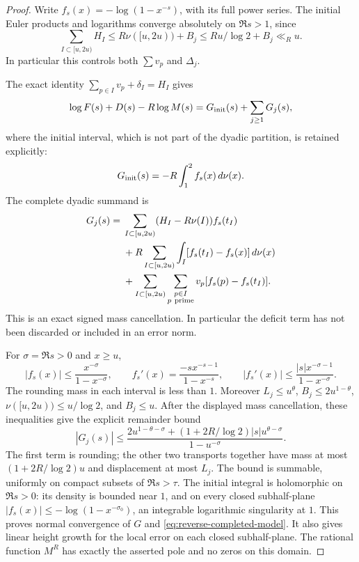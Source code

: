 \documentclass[11pt]{article}
\theoremstyle{definition}
\begin{document}
\begin{proof}
Write $f_s(x)=-\log(1-x^{-s})$, with its full power series.
The initial Euler products and logarithms converge absolutely on
$\Re s>1$, since
\[
 \sum_{I\subset[u,2u)}H_I
 \le R\nu([u,2u))+B_j\le R u/\log2+B_j\ll_R u.
\]
In particular this controls both $\sum v_p$ and $\Delta_j$.

The exact identity $\sum_{p\in I}v_p+\delta_I=H_I$ gives
\begin{equation}
 \log F(s)+D(s)-R\log M(s)=G_{\rm init}(s)+\sum_{j\ge1}G_j(s),
 \label{eq:reverse-exact-signed-log}
\end{equation}
where the initial interval, which is not part of the dyadic partition,
is retained explicitly:
\[
 G_{\rm init}(s)=-R\int_1^2 f_s(x)\,d\nu(x).
\]
The complete dyadic summand is
\begin{align*}
 G_j(s)={}&
 \sum_{I\subset[u,2u)}(H_I-R\nu(I))f_s(t_I)\\
 &+R\sum_{I\subset[u,2u)}
                  \int_I[f_s(t_I)-f_s(x)]\,d\nu(x)\\
 &+\sum_{I\subset[u,2u)}
             \sum_{\substack{p\in I\\p\ {\rm prime}}}
                    v_p[f_s(p)-f_s(t_I)] .
\end{align*}
This is an exact signed mass cancellation. In particular the
deficit term has not been discarded or included in an error norm.

For $\sigma=\Re s>0$ and $x\ge u$,
\[
 |f_s(x)|\le\frac{x^{-\sigma}}{1-x^{-\sigma}},\qquad
 f_s'(x)=\frac{-s x^{-s-1}}{1-x^{-s}},\qquad
 |f_s'(x)|\le\frac{|s|x^{-\sigma-1}}{1-x^{-\sigma}}.
\]
The rounding mass in each interval is less than $1$.
Moreover $L_j\le u^\theta$, $B_j\le2u^{1-\theta}$,
$\nu([u,2u))\le u/\log2$, and $B_j\le u$.
After the displayed mass cancellation, these inequalities give
the explicit remainder bound
\begin{equation}
 |G_j(s)|\le
 \frac{2u^{1-\theta-\sigma}
            +(1+2R/\log2)|s|u^{\theta-\sigma}}
      {1-u^{-\sigma}}.
 \label{eq:reverse-local-transport-bound}
\end{equation}
The first term is rounding; the other two transports together
have mass at most $(1+2R/\log2)u$ and displacement at most $L_j$.
The bound is summable, uniformly on compact subsets of
$\Re s>\tau$. The initial integral is holomorphic on $\Re s>0$:
its density is bounded near $1$, and on every closed subhalf-plane
$|f_s(x)|\le-\log(1-x^{-\sigma_0})$, an integrable logarithmic
singularity at $1$. This proves normal convergence of $G$ and
\eqref{eq:reverse-completed-model}. It also gives linear height
growth for the local error on each closed subhalf-plane.
The rational function $M^R$ has exactly the asserted pole and
no zeros on this domain.


\end{proof}
\end{document}
